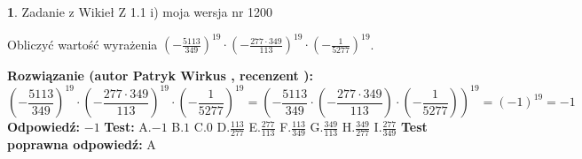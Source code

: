 \documentclass[12pt, a4paper]{article}
\theoremstyle{definition} %
\newtheorem{zad}{}
\newcommand{\zadStart}[1]{\begin{zad}#1\newline}
\newcommand{\zadStop}{\end{zad}}
\newcommand{\rozwStart}[2]{\noindent \textbf{Rozwiązanie (autor #1 , recenzent #2): }\newline}
\newcommand{\rozwStop}{\newline}
\newcommand{\odpStart}{\noindent \textbf{Odpowiedź:}\newline}
\newcommand{\odpStop}{\newline}
\newcommand{\testStart}{\noindent \textbf{Test:}\newline}
\newcommand{\testStop}{\newline}
\newcommand{\kluczStart}{\noindent \textbf{Test poprawna odpowiedź:}\newline}
\newcommand{\kluczStop}{\newline}
\begin{document}
\zadStart{Zadanie z Wikieł Z 1.1 i) moja wersja nr 1200}

Obliczyć wartość wyrażenia $(-\frac{5113}{349})^{19} \cdot (-\frac{277 \cdot 349}{113})^{19} \cdot (-\frac{1}{5277})^{19}$.
\zadStop
\rozwStart{Patryk Wirkus}{}
$$(-\frac{5113}{349})^{19} \cdot (-\frac{277 \cdot 349}{113})^{19} \cdot (-\frac{1}{5277})^{19} = (-\frac{5113}{349} \cdot (-\frac{277 \cdot 349}{113}) \cdot (-\frac{1}{5277}))^{19} = (-1)^{19} = -1$$
\rozwStop
\odpStart
$-1$
\odpStop
\testStart
A.$-1$ B.$1$ C.$0$ D.$\frac{113}{277}$ E.$\frac{277}{113}$
F.$\frac{113}{349}$ G.$\frac{349}{113}$
H.$\frac{349}{277}$
I.$\frac{277}{349}$
\testStop
\kluczStart
A
\kluczStop
\end{document}

